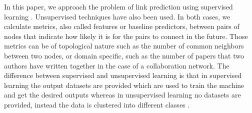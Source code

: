 \documentclass{acm_proc_article-sp}
\begin{document}
In this paper, we approach the problem of link prediction using supervised learning \cite{Fire2013, Hasan06linkprediction, Lichtenwalter:2010:NPM:1835804.1835837, Wang:2007:LPM:1441428.1442084}. Unsupervised techniques have also been used. In both cases, we calculate metrics, also called features or baseline predictors, between pairs of nodes that indicate how likely it is for the pairs to connect in the future. Those metrics can be of topological nature such as the number of common neighbors between two nodes, or domain specific, such as the number of papers that two authors have written together in the case of a collaboration network. The difference between supervised and unsupervised learning is that in supervised learning the output datasets are provided which are used to train the machine and get the desired outputs whereas in unsupervised learning no datasets are provided, instead the data is clustered into different classes . 





\end{document}
